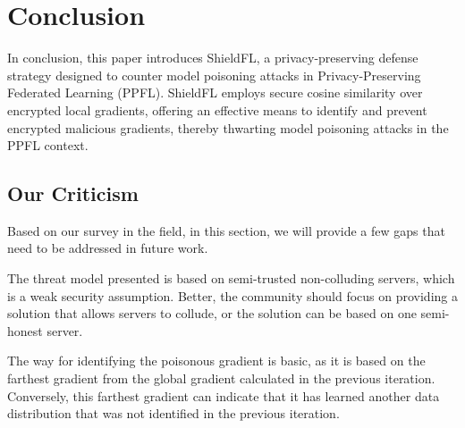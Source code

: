 \section{Conclusion}
\label{sec:conclusion}

In conclusion, this paper introduces ShieldFL, a privacy-preserving defense strategy designed to counter model poisoning attacks in Privacy-Preserving Federated Learning (PPFL). ShieldFL employs secure cosine similarity over encrypted local gradients, offering an effective means to identify and prevent encrypted malicious gradients, thereby thwarting model poisoning attacks in the PPFL context. 

\subsection{Our Criticism}

Based on our survey in the field, in this section, we will provide a few gaps that need to be addressed in future work.
\begin{enumerate*}
    \item The threat model presented is based on semi-trusted non-colluding servers, which is a weak security assumption.
    Better, the community should focus on providing a solution that allows servers to collude, or the solution can be based on one semi-honest server.
    \item The way for identifying the poisonous gradient is basic, as it is based on the farthest gradient from the global gradient calculated in the previous iteration.
    Conversely, this farthest gradient can indicate that it has learned another data distribution that was not identified in the previous iteration.
\end{enumerate*}
